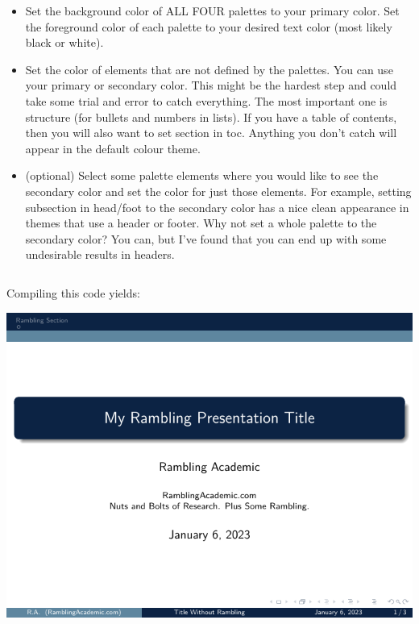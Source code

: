 \begin{column}{0.5\textwidth}
\begin{itemize}
  \item Set the background color of ALL FOUR palettes to your primary color. Set the foreground color of each palette to your desired text color (most likely black or white).
  \item Set the color of elements that are not defined by the palettes. You can use your primary or secondary color. This might be the hardest step and could take some trial and error to catch everything. The most important one is {\ttfamily structure} (for bullets and numbers in lists). If you have a table of contents, then you will also want to set {\ttfamily section} in {\ttfamily toc}. Anything you don’t catch will appear in the default colour theme.
  \item (optional) Select some palette elements where you would like to see the secondary color and set the color for just those elements. For example, setting {\ttfamily subsection} in {\ttfamily head/foot} to the secondary color has a nice clean appearance in themes that use a header or footer. Why not set a whole palette to the secondary color? You can, but I’ve found that you can end up with some undesirable results in headers.
\end{itemize}

\inputminted[linenos=true]{latex}{examples/beamer/beamercolor02.tex}

Compiling this code yields:

\includegraphics[page=1]{examples/beamer/beamercolor02.pdf}


\end{column}
